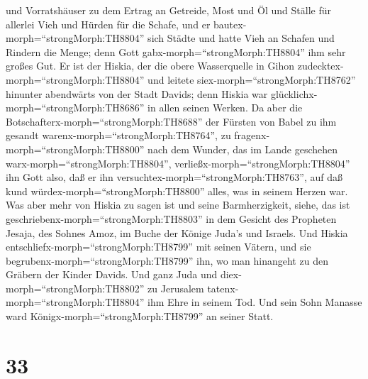  und Vorratshäuser zu dem Ertrag an Getreide, Most und Öl
und Ställe für allerlei Vieh und Hürden für die Schafe, 
und er bautex-morph=``strongMorph:TH8804'' sich Städte und hatte Vieh an
Schafen und Rindern die Menge; denn Gott
gabx-morph=``strongMorph:TH8804'' ihm sehr großes Gut.  Er
ist der Hiskia, der die obere Wasserquelle in Gihon
zudecktex-morph=``strongMorph:TH8804'' und leitete
siex-morph=``strongMorph:TH8762'' hinunter abendwärts von der Stadt
Davids; denn Hiskia war glücklichx-morph=``strongMorph:TH8686'' in allen
seinen Werken.  Da aber die
Botschafterx-morph=``strongMorph:TH8688'' der Fürsten von Babel zu ihm
gesandt warenx-morph=``strongMorph:TH8764'', zu
fragenx-morph=``strongMorph:TH8800'' nach dem Wunder, das im Lande
geschehen warx-morph=``strongMorph:TH8804'',
verließx-morph=``strongMorph:TH8804'' ihn Gott also, daß er ihn
versuchtex-morph=``strongMorph:TH8763'', auf daß kund
würdex-morph=``strongMorph:TH8800'' alles, was in seinem Herzen war.
 Was aber mehr von Hiskia zu sagen ist und seine
Barmherzigkeit, siehe, das ist geschriebenx-morph=``strongMorph:TH8803''
in dem Gesicht des Propheten Jesaja, des Sohnes Amoz, im Buche der
Könige Juda's und Israels.  Und Hiskia
entschliefx-morph=``strongMorph:TH8799'' mit seinen Vätern, und sie
begrubenx-morph=``strongMorph:TH8799'' ihn, wo man hinangeht zu den
Gräbern der Kinder Davids. Und ganz Juda und
diex-morph=``strongMorph:TH8802'' zu Jerusalem
tatenx-morph=``strongMorph:TH8804'' ihm Ehre in seinem Tod. Und sein
Sohn Manasse ward Königx-morph=``strongMorph:TH8799'' an seiner Statt.

\hypertarget{section-32}{%
\section{33}\label{section-32}}


